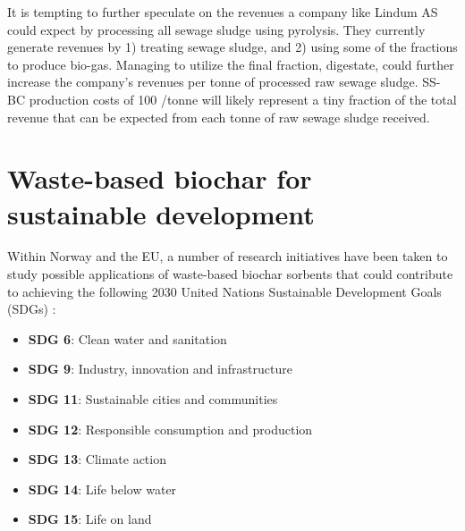 It is tempting to further speculate on the revenues a company like Lindum AS could expect by processing all sewage sludge using pyrolysis. They currently generate revenues by 1) treating sewage sludge, and 2) using some of the fractions to produce bio-gas. Managing to utilize the final fraction, digestate, could further increase the company's revenues per tonne of processed raw sewage sludge. SS-BC production costs of 100 \texteuro/tonne will likely represent a tiny fraction of the total revenue that can be expected from each tonne of raw sewage sludge received. 


\section{Waste-based biochar for sustainable development \label{sec:SDGs}}
Within Norway and the EU, a number of research initiatives have been taken to study possible applications of waste-based biochar sorbents that could contribute to achieving the following   2030 United Nations Sustainable Development Goals (\acrshort{SDGs}) \citep{SDGs2015}:
\begin{itemize}
    \item \textbf{SDG 6}:  Clean water and sanitation
    \item \textbf{SDG 9}:  Industry, innovation and infrastructure
    \item \textbf{SDG 11}: Sustainable cities and communities
    \item \textbf{SDG 12}: Responsible consumption and production
    \item \textbf{SDG 13}: Climate action
    \item \textbf{SDG 14}: Life below water
    \item \textbf{SDG 15}: Life on land
\end{itemize}

